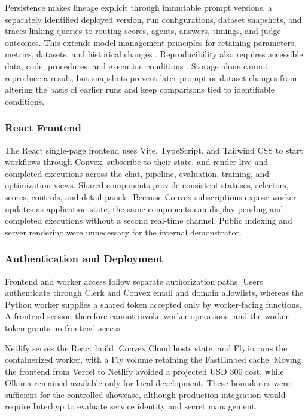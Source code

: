 Persistence makes lineage explicit through immutable prompt versions, a separately identified deployed version, run configurations, dataset snapshots, and traces linking queries to routing scores, agents, answers, timings, and judge outcomes. This extends model-management principles for retaining parameters, metrics, datasets, and historical changes \autocite{vartak-modeldb}. Reproducibility also requires accessible data, code, procedures, and execution conditions \autocite{pineau-reproducibility}. Storage alone cannot reproduce a result, but snapshots prevent later prompt or dataset changes from altering the basis of earlier runs and keep comparisons tied to identifiable conditions.

\subsubsection{React Frontend}\label{sec:react-frontend}

The React single-page frontend uses Vite, TypeScript, and Tailwind CSS to start workflows through Convex, subscribe to their state, and render live and completed executions across the chat, pipeline, evaluation, training, and optimization views. Shared components provide consistent statuses, selectors, scores, controls, and detail panels. Because Convex subscriptions expose worker updates as application state, the same components can display pending and completed executions without a second real-time channel. Public indexing and server rendering were unnecessary for the internal demonstrator.

\subsubsection{Authentication and Deployment}\label{sec:application-deployment}

Frontend and worker access follow separate authorization paths. Users authenticate through Clerk and Convex email and domain allowlists, whereas the Python worker supplies a shared token accepted only by worker-facing functions. A frontend session therefore cannot invoke worker operations, and the worker token grants no frontend access.

Netlify serves the React build, Convex Cloud hosts state, and Fly.io runs the containerized worker, with a Fly volume retaining the FastEmbed cache. Moving the frontend from Vercel to Netlify avoided a projected USD 300 cost, while Ollama remained available only for local development. These boundaries were sufficient for the controlled showcase, although production integration would require Interhyp to evaluate service identity and secret management.

